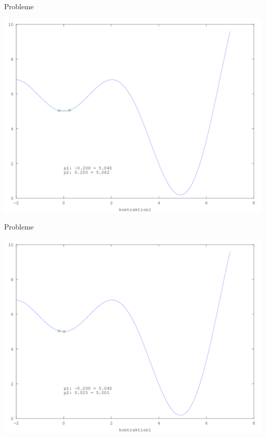 \documentclass[\outputformat]{beamer}
\begin{document}
\begin{frame}{Probleme}
	\begin{center}
		\includegraphics[height=0.75\paperheight]{../bilder/LokMinima/sinx_x005.png}
	\end{center}
\end{frame}
\begin{frame}{Probleme}
	\begin{center}
		\includegraphics[height=0.75\paperheight]{../bilder/LokMinima/sinx_x006.png}
	\end{center}
\end{frame}
\end{document}
